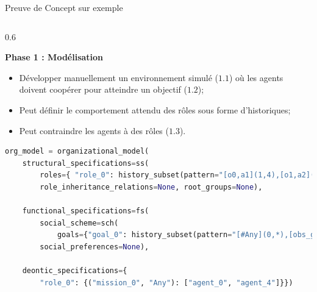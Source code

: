 \begin{frame}[fragile]{Preuve de Concept sur exemple}{}

    \begin{columns}

        \begin{column}{0.6\textwidth}
    
            \textbf{Phase 1 : Modélisation}
    
            \begin{itemize}
                \item Développer manuellement un environnement simulé ($1.1$) où les agents doivent coopérer pour atteindre un objectif ($1.2$);
                \item Peut définir le comportement attendu des rôles sous forme d'historiques;
                \item Peut contraindre les agents à des rôles ($1.3$).
            \end{itemize}
    
            \begin{lstlisting}[language=Python,basicstyle=\scriptsize]
org_model = organizational_model(
    structural_specifications=ss(
        roles={ "role_0": history_subset(pattern="[o0,a1](1,4),[o1,a2](1,2)")},
        role_inheritance_relations=None, root_groups=None),
    
    functional_specifications=fs(
        social_scheme=sch(
            goals={"goal_0": history_subset(pattern="[#Any](0,*),[obs_goal_0]")},missions=["mission_0"], goals_structure=None,mission_to_goals={"mission_0": ["goal_0"]},mission_to_agent_cardinality=None),
        social_preferences=None),

    deontic_specifications={
        "role_0": {("mission_0", "Any"): ["agent_0", "agent_4"]}})\end{lstlisting}

        \end{column}
    

\end{columns}
\end{frame}
